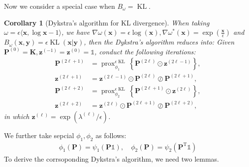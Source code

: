 \documentclass[11pt]{book}
\newtheorem{corollary}[theorem]{Corollary}
\begin{document}
Now we consider a special case when $B_{\omega} = \operatorname{KL}$.
\begin{corollary}[Dykstra's algorithm for KL divergence]\label{corollary:Dykstra_KL}
    When taking $\omega = \epsilon \langle \mathbf{x}, \log \mathbf{x} -1 \rangle$, we have $\nabla\omega(\mathbf{x}) = \epsilon \log(\mathbf{x}), \nabla\omega^*(\mathbf{x}) = \exp(\frac{\mathbf{x}}{\epsilon})$ and $B_{\omega}(\mathbf{x},\mathbf{y}) = \epsilon\operatorname{KL}(\mathbf{x}|\mathbf{y})$, then the Dykstra's algorithm reduces into: Given $\mathbf{P}^{(0)} = \mathbf{K}, \mathbf{z}^{(-1)} = \mathbf{z}^{(0)} = \mathbb{1}$, conduct the following iterations:
    \begin{align}
        \mathbf{P}^{(2\ell+1)} &= \operatorname{prox}^{\epsilon\operatorname{KL}}_{\phi_1} \left\{ \mathbf{P}^{(2\ell)} \odot \mathbf{z}^{(2\ell-1)} \right\},\\
        \mathbf{z}^{(2\ell+1)} &= \mathbf{z}^{(2\ell-1)} \odot \mathbf{P}^{(2\ell)}\oslash \mathbf{P}^{(2\ell+1)},\\
        \mathbf{P}^{(2\ell+2)} &= \operatorname{prox}^{\epsilon\operatorname{KL}}_{\phi_2} \left\{ \mathbf{P}^{(2\ell+1)} \odot \mathbf{z}^{(2\ell)} \right\},\\
        \mathbf{z}^{(2\ell+2)} &= \mathbf{z}^{(2\ell)} \odot \mathbf{P}^{(2\ell+1)}\oslash \mathbf{P}^{(2\ell+2)},
    \end{align}
    in which $\mathbf{z}^{(\ell)} = \exp(\lambda^{(\ell)}/\epsilon)$.
\end{corollary}

We further take sepcial $\phi_1, \phi_2$ as follows:
\begin{align}\label{eqn:psi1_psi2}
    \phi_1(\mathbf{P}) = \psi_1(\mathbf{P}\mathbb{1}), \quad
    \phi_2(\mathbf{P}) = \psi_2(\mathbf{P}^{\mathrm{T}}\mathbb{1})
\end{align}
To derive the corrsoponding Dykstra's algorithm, we need two lemmas.
\end{document}
